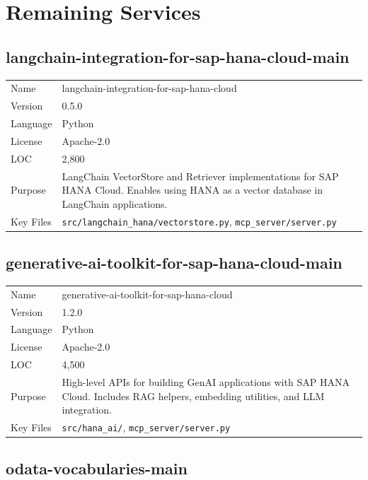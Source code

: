 \documentclass[11pt,a4paper]{article}
\begin{document}
\section{Remaining Services}

\subsection{langchain-integration-for-sap-hana-cloud-main}

\begin{tabular}{@{}L{4cm}L{10cm}@{}}
\toprule
Name & langchain-integration-for-sap-hana-cloud \\
Version & 0.5.0 \\
Language & Python \\
License & Apache-2.0 \\
LOC & 2,800 \\
Purpose & LangChain VectorStore and Retriever implementations for SAP HANA Cloud. Enables using HANA as a vector database in LangChain applications. \\
Key Files & \texttt{src/langchain\_hana/vectorstore.py}, \texttt{mcp\_server/server.py} \\
\bottomrule
\end{tabular}

\subsection{generative-ai-toolkit-for-sap-hana-cloud-main}

\begin{tabular}{@{}L{4cm}L{10cm}@{}}
\toprule
Name & generative-ai-toolkit-for-sap-hana-cloud \\
Version & 1.2.0 \\
Language & Python \\
License & Apache-2.0 \\
LOC & 4,500 \\
Purpose & High-level APIs for building GenAI applications with SAP HANA Cloud. Includes RAG helpers, embedding utilities, and LLM integration. \\
Key Files & \texttt{src/hana\_ai/}, \texttt{mcp\_server/server.py} \\
\bottomrule
\end{tabular}

\subsection{odata-vocabularies-main}
\end{document}
